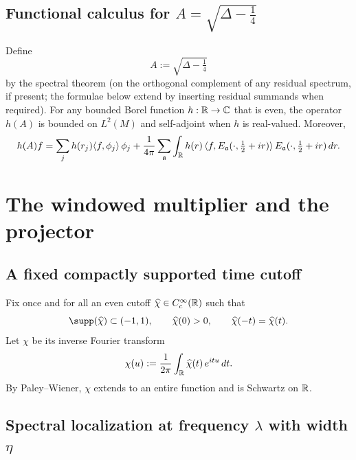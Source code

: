 \subsection{Functional calculus for $A=\sqrt{\Delta-\tfrac14}$}\label{subsec:sp-fc}

Define
\[
A:=\sqrt{\Delta-\tfrac14}
\]
by the spectral theorem (on the orthogonal complement of any residual spectrum, if present; the formulae below
extend by inserting residual summands when required). For any bounded Borel function $h:\mathbb{R}\to\mathbb{C}$ that is even,
the operator $h(A)$ is bounded on $L^2(M)$ and self-adjoint when $h$ is real-valued. Moreover,
\begin{equation}\label{eq:sp-multiplier}
h(A)f
=\sum_j h(r_j)\langle f,\phi_j\rangle\,\phi_j
+\frac{1}{4\pi}\sum_{\mathfrak a}\int_{\mathbb{R}} h(r)\,
\langle f,E_{\mathfrak a}(\cdot,\tfrac12+ir)\rangle\,E_{\mathfrak a}(\cdot,\tfrac12+ir)\,dr.
\end{equation}

\section{The windowed multiplier and the projector}\label{sec:sp-window}

\subsection{A fixed compactly supported time cutoff}\label{subsec:sp-cutoff}

Fix once and for all an even cutoff $\widehat\chi\in C_c^\infty(\mathbb{R})$ such that
\begin{equation}\label{eq:sp-chi-hat}
\supp(\widehat\chi)\subset (-1,1),\qquad \widehat\chi(0)>0,\qquad \widehat\chi(-t)=\widehat\chi(t).
\end{equation}
Let $\chi$ be its inverse Fourier transform
\begin{equation}\label{eq:sp-chi}
\chi(u):=\frac{1}{2\pi}\int_{\mathbb{R}}\widehat\chi(t)\,e^{itu}\,dt.
\end{equation}
By Paley--Wiener, $\chi$ extends to an entire function and is Schwartz on $\mathbb{R}$.

\subsection{Spectral localization at frequency $\lambda$ with width $\eta$}\label{subsec:sp-window-def}

